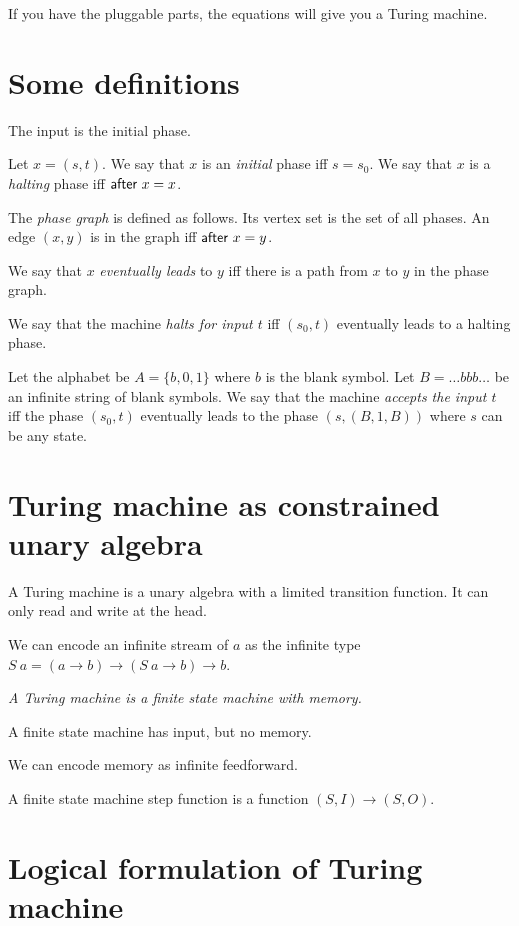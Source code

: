 If you have the pluggable parts,
the equations will give you a Turing machine.

\section{Some definitions}

The input is the initial phase.

Let \(x = (s,t)\).
We say that \(x\) is an \emph{initial} phase iff \(s = s_0\).
We say that \(x\) is a \emph{halting} phase iff \(\textsf{after}~x = x\).

The \emph{phase graph} is defined as follows.
Its vertex set is the set of all phases.
An edge \((x,y)\) is in the graph iff \(\textsf{after}~x = y\).

We say that \(x\) \emph{eventually leads} to \(y\) iff
there is a path from \(x\) to \(y\) in the phase graph.

We say that the machine \emph{halts for input \(t\)} iff
\((s_0,t)\) eventually leads to a halting phase.

Let the alphabet be \(A = \{b,0,1\}\) where \(b\) is the blank symbol.
Let \(B = \ldots bbb \ldots\) be an infinite string of blank symbols.
We say that the machine \emph{accepts the input \(t\)} iff
the phase \((s_0,t)\) eventually leads to the phase \((s, (B,1,B))\)
where \(s\) can be any state.

\section{Turing machine as constrained unary algebra}

A Turing machine is a unary algebra with a limited transition function.
It can only read and write at the head.

We can encode an infinite stream of \(a\)
as the infinite type \(S~a = (a \to b) \to (S~a \to b) \to b\).

\emph{A Turing machine is a finite state machine with memory.}

A finite state machine has input, but no memory.

We can encode memory as infinite feedforward.

A finite state machine step function is a function \((S,I) \to (S,O)\).

\section{Logical formulation of Turing machine}

